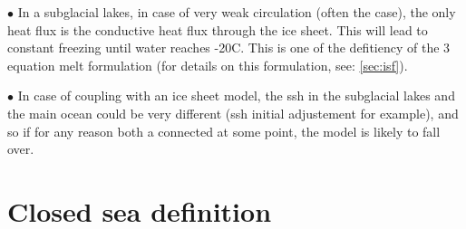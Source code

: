 \documentclass[../main/NEMO_manual]{subfiles}
\begin{document}
\begin{description}
\item $\bullet$ In a subglacial lakes, in case of very weak circulation (often the case), the only heat flux is the conductive heat flux through the ice sheet. 
  This will lead to constant freezing until water reaches -20C. 
  This is one of the defitiency of the 3 equation melt formulation (for details on this formulation, see: \autoref{sec:isf}).
\item $\bullet$ In case of coupling with an ice sheet model, 
  the ssh in the subglacial lakes and the main ocean could be very different (ssh initial adjustement for example), 
  and so if for any reason both a connected at some point, the model is likely to fall over.\\
\end{description}

\section{Closed sea definition}
\label{sec:clocfg}
\end{document}
